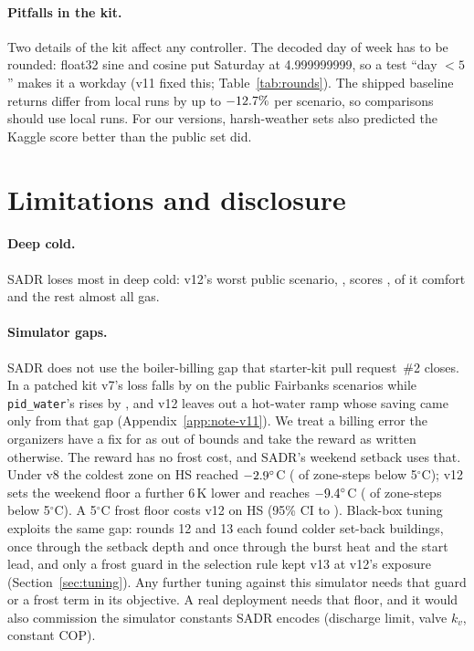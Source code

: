 \documentclass{article}
\begin{document}
\paragraph{Pitfalls in the kit.} Two details of the kit affect any controller. The decoded day of week has to be rounded: float32 sine and cosine put Saturday at 4.999999999, so a test ``day $<5$'' makes it a workday (v11 fixed this; Table~\ref{tab:rounds}). The shipped baseline returns differ from local runs by up to $-12.7\%$ per scenario, so comparisons should use local runs. For our versions, harsh-weather sets also predicted the Kaggle score better than the public set did.

\section{Limitations and disclosure}
\label{sec:limits}
\paragraph{Deep cold.} SADR loses most in deep cold: v12's worst public scenario, \RElvWorstPubScen, scores \RElvWorstPub, \RElvWorstPubComfortShare{} of it comfort and the rest almost all gas.

\paragraph{Simulator gaps.} SADR does not use the boiler-billing gap that starter-kit pull request~\#2 closes. In a patched kit v7's loss falls by \RFivePrTwoVSevenRelAbs{} on the \RFivePrTwoVSevenN{} public Fairbanks scenarios while \texttt{pid\_water}'s rises by \RFivePrTwoPidRelAbs, and v12 leaves out a hot-water ramp whose saving came only from that gap (Appendix~\ref{app:note-v11}). We treat a billing error the organizers have a fix for as out of bounds and take the reward as written otherwise. The reward has no frost cost, and SADR's weekend setback uses that. Under v8 the coldest zone on HS reached $-2.9^\circ$C (\RSixDecBelowFive{} of zone-steps below 5$^\circ$C); v12 sets the weekend floor a further 6\,K lower and reaches $-9.4^\circ$C (\RElvBelowFiveHS{} of zone-steps below 5$^\circ$C). A 5$^\circ$C frost floor costs v12 \RElvFrostHsRel{} on HS (95\% CI \RElvFrostHsLo{} to \RElvFrostHsHi). Black-box tuning exploits the same gap: rounds 12 and 13 each found colder set-back buildings, once through the setback depth and once through the burst heat and the start lead, and only a frost guard in the selection rule kept v13 at v12's exposure (Section~\ref{sec:tuning}). Any further tuning against this simulator needs that guard or a frost term in its objective. A real deployment needs that floor, and it would also commission the simulator constants SADR encodes (discharge limit, valve $k_v$, constant COP).
\end{document}
